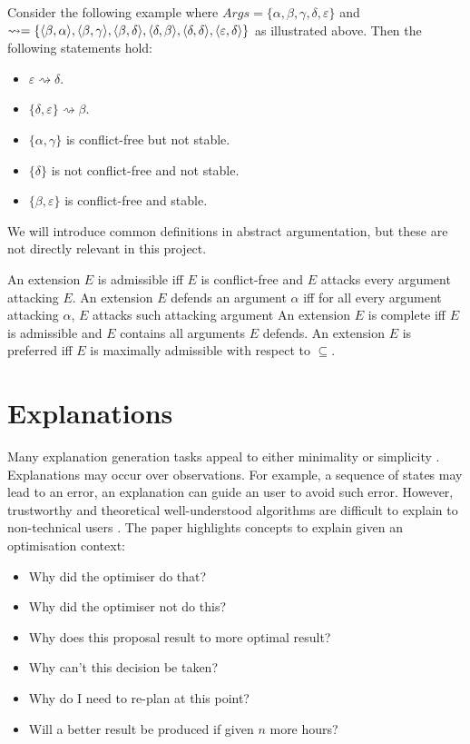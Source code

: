 Consider the following example where $Args=\{\alpha,\beta,\gamma,\delta,\varepsilon\}$ and $	\rightsquigarrow=\{
\langle{\beta},{\alpha}\rangle,\\
\langle{\beta},{\gamma}\rangle,
\langle{\beta},{\delta}\rangle,
\langle{\delta},{\beta}\rangle,
\langle{\delta},{\delta}\rangle,
\langle{\varepsilon},{\delta}\rangle
\}$ as illustrated above. Then the following statements hold:
\begin{itemize}
	\item $\varepsilon\rightsquigarrow\delta$.
	\item $\{\delta,\varepsilon\}\rightsquigarrow\beta$.
	\item $\{\alpha,\gamma\}$ is conflict-free but not stable.
	\item $\{\delta\}$ is not conflict-free and not stable.
	\item $\{\beta,\varepsilon\}$ is conflict-free and stable.
\end{itemize}

We will introduce common definitions in abstract argumentation, but these are not directly relevant in this project. 

\begin{definition}
	An extension $E$ is admissible iff $E$ is conflict-free and $E$ attacks every argument attacking $E$.
	\linespace
	An extension $E$ defends an argument $\alpha$ iff for all every argument attacking $\alpha$, $E$ attacks such attacking argument 
	\linespace
	An extension $E$ is complete iff $E$ is admissible and $E$ contains all arguments $E$ defends.
	\linespace
	An extension $E$ is preferred iff $E$ is maximally admissible with respect to $\subseteq$.
\end{definition}

\section{Explanations}

Many explanation generation tasks appeal to either minimality or simplicity \cite{pe}. Explanations may occur over observations. For example, a sequence of states may lead to an error, an explanation can guide an user to avoid such error. However, trustworthy and theoretical well-understood algorithms are difficult to explain to non-technical users \cite{ep}. The paper highlights concepts to explain given an optimisation context:
\begin{itemize}
	\item Why did the optimiser do that?
	\item Why did the optimiser not do this?
	\item Why does this proposal result to more optimal result?
	\item Why can't this decision be taken?
	\item Why do I need to re-plan at this point?
	\item Will a better result be produced if given $n$ more hours?
\end{itemize}

